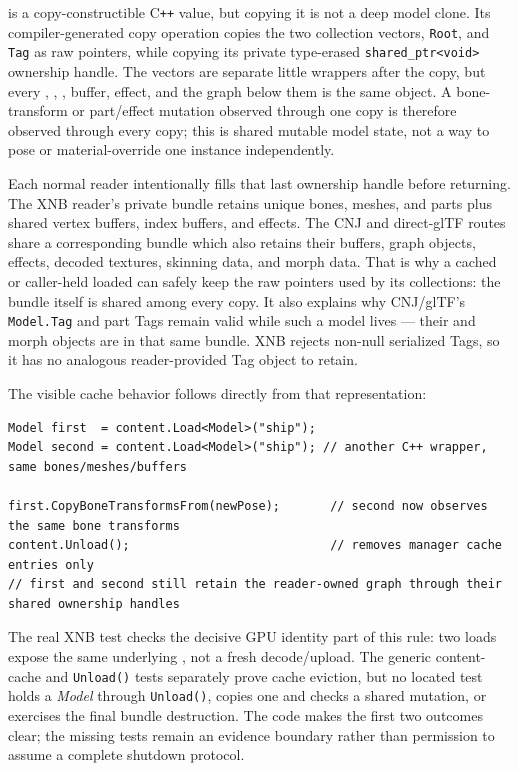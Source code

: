  is a copy-constructible C\texttt{++} value, but copying it is not a deep model
clone. Its compiler-generated copy operation copies the two collection vectors, \texttt{Root},
and \texttt{Tag} as raw pointers, while copying its private type-erased
\texttt{shared\_ptr<void>} ownership handle. The vectors are separate little wrappers after the
copy, but every , , , buffer,
effect, and the graph below them is the same object. A bone-transform or part/effect mutation
observed through one copy is therefore observed through every copy; this is shared mutable model
state, not a way to pose or material-override one instance independently.

Each normal reader intentionally fills that last ownership handle before returning. The XNB
reader's private bundle retains unique bones, meshes, and parts plus shared vertex buffers,
index buffers, and effects. The CNJ and direct-glTF routes share a corresponding bundle which
also retains their buffers, graph objects, effects, decoded textures, skinning data, and morph
data. That is why a cached or caller-held loaded  can safely keep the raw
pointers used by its collections: the bundle itself is shared among every copy. It also explains
why CNJ/glTF's \texttt{Model.Tag} and part Tags remain valid while such a model lives --- their
 and morph objects are in that same bundle. XNB rejects non-null serialized
Tags, so it has no analogous reader-provided Tag object to retain.

The visible cache behavior follows directly from that representation:

\begin{lstlisting}
Model first  = content.Load<Model>("ship");
Model second = content.Load<Model>("ship"); // another C++ wrapper, same bones/meshes/buffers

first.CopyBoneTransformsFrom(newPose);       // second now observes the same bone transforms
content.Unload();                            // removes manager cache entries only
// first and second still retain the reader-owned graph through their shared ownership handles
\end{lstlisting}

The real XNB test checks the decisive GPU identity part of this rule: two loads expose the same
underlying , not a fresh decode/upload. The generic content-cache and
\texttt{Unload()} tests separately prove cache eviction, but no located test holds a \emph{Model}
through \texttt{Unload()}, copies one and checks a shared mutation, or exercises the final
bundle destruction. The code makes the first two outcomes clear; the missing tests remain an
evidence boundary rather than permission to assume a complete shutdown protocol.

